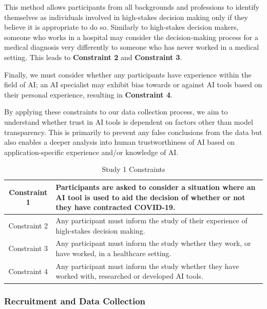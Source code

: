 \documentclass[manuscript,screen,review]{acmart}
\begin{document}
This method allows participants from all backgrounds and professions to identify themselves as individuals involved in high-stakes decision making only if they believe it is appropriate to do so. Similarly to high-stakes decision makers, someone who works in a hospital may consider the decision-making process for a medical diagnosis very differently to someone who has never worked in a medical setting. This leads to \textbf{Constraint 2} and \textbf{Constraint 3}.

Finally, we must consider whether any participants have experience within the field of AI; an AI specialist may exhibit bias towards or against AI tools based on their personal experience, resulting in \textbf{Constraint 4}.

By applying these constraints to our data collection process, we aim to understand whether trust in AI tools is dependent on factors other than model transparency. This is primarily to prevent any false conclusions from the data but also enables a deeper analysis into human trustworthiness of AI based on application-specific experience and/or knowledge of AI.

\begin{table}
\begin{center}
\begin{tabular}{ | c | p{11cm} |}
    \hline
     Constraint 1 & Participants are asked to consider a situation where an AI tool is used to aid the decision of whether or not they have contracted COVID-19.\\
     \hline
     Constraint 2 & Any participant must inform the study of their experience of high-stakes decision making.\\
     \hline
    Constraint 3 & Any participant must inform the study whether they work, or have worked, in a healthcare setting.\\
     \hline
     Constraint 4 & Any participant must inform the study whether they have worked with, researched or developed AI tools.\\
    \hline
\end{tabular}
\caption{Study 1 Constraints}
\label{table:study1_constraints}
\end{center}
\end{table}

\subsubsection{Recruitment and Data Collection}
\label{study1_recruitment_datacollection}
\end{document}
